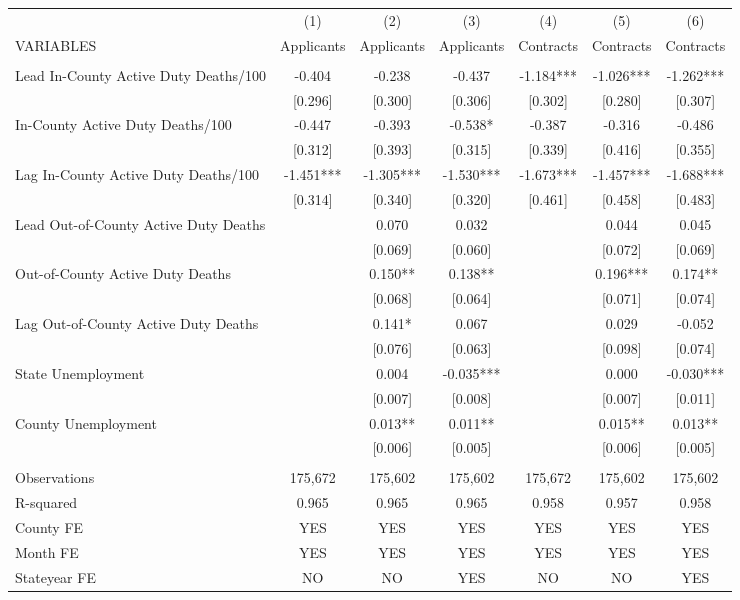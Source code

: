 \documentclass[]{article}
\begin{document}
\begin{tabular}{lcccccc} \hline
 & (1) & (2) & (3) & (4) & (5) & (6) \\
VARIABLES & Applicants & Applicants & Applicants & Contracts & Contracts & Contracts \\ \hline
 &  &  &  &  &  &  \\
Lead In-County Active Duty Deaths/100 & -0.404 & -0.238 & -0.437 & -1.184*** & -1.026*** & -1.262*** \\
 & [0.296] & [0.300] & [0.306] & [0.302] & [0.280] & [0.307] \\
In-County Active Duty Deaths/100 & -0.447 & -0.393 & -0.538* & -0.387 & -0.316 & -0.486 \\
 & [0.312] & [0.393] & [0.315] & [0.339] & [0.416] & [0.355] \\
Lag In-County Active Duty Deaths/100 & -1.451*** & -1.305*** & -1.530*** & -1.673*** & -1.457*** & -1.688*** \\
 & [0.314] & [0.340] & [0.320] & [0.461] & [0.458] & [0.483] \\
Lead Out-of-County Active Duty Deaths &  & 0.070 & 0.032 &  & 0.044 & 0.045 \\
 &  & [0.069] & [0.060] &  & [0.072] & [0.069] \\
Out-of-County Active Duty Deaths &  & 0.150** & 0.138** &  & 0.196*** & 0.174** \\
 &  & [0.068] & [0.064] &  & [0.071] & [0.074] \\
Lag Out-of-County Active Duty Deaths &  & 0.141* & 0.067 &  & 0.029 & -0.052 \\
 &  & [0.076] & [0.063] &  & [0.098] & [0.074] \\
State Unemployment &  & 0.004 & -0.035*** &  & 0.000 & -0.030*** \\
 &  & [0.007] & [0.008] &  & [0.007] & [0.011] \\
County Unemployment &  & 0.013** & 0.011** &  & 0.015** & 0.013** \\
 &  & [0.006] & [0.005] &  & [0.006] & [0.005] \\
 &  &  &  &  &  &  \\
Observations & 175,672 & 175,602 & 175,602 & 175,672 & 175,602 & 175,602 \\
R-squared & 0.965 & 0.965 & 0.965 & 0.958 & 0.957 & 0.958 \\
County FE & YES & YES & YES & YES & YES & YES \\
Month FE & YES & YES & YES & YES & YES & YES \\
 Stateyear FE & NO & NO & YES & NO & NO & YES \\ \hline

\end{tabular}
\end{document}
